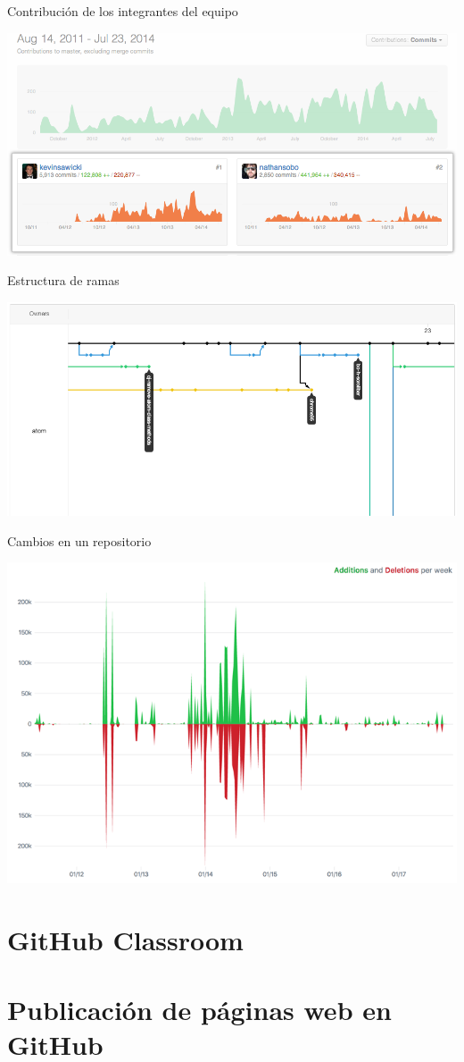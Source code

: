 \documentclass[xcolor={usenames,svgnames,dvipsnames}]{beamer}
\begin{document}
\begin{frame}[label={sec:orga994e83}]{Contribución de los integrantes del equipo}
\begin{center}
\includegraphics[width=.9\linewidth]{figs/repo_contributors_specific_graph.png}
\end{center}
\end{frame}

\begin{frame}[label={sec:org3557247}]{Estructura de ramas}
\begin{center}
\includegraphics[width=.9\linewidth]{figs/repo_network_graph.png}
\end{center}
\end{frame}

\begin{frame}[label={sec:org4cdb361}]{Cambios en un repositorio}
\begin{center}
\includegraphics[width=.9\linewidth]{figs/repo_code_frequency_graph_dotcom.png}
\end{center}
\end{frame}

\section{GitHub Classroom}
\label{sec:orge3cee8c}
\section{Publicación de páginas web en GitHub}
\label{sec:org3ae173e}
\end{document}
